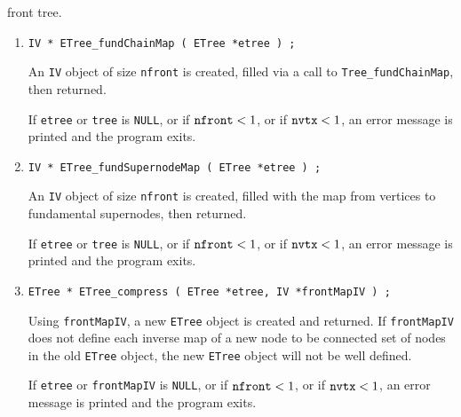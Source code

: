 front tree.
\begin{enumerate}
\item
\begin{verbatim}
IV * ETree_fundChainMap ( ETree *etree ) ;
\end{verbatim}
An {\tt IV} object of size {\tt nfront} is created, 
filled via a call to {\tt Tree\_fundChainMap},
then returned.
\par {}
If {\tt etree} or {\tt tree} is {\tt NULL},
or if ${\tt nfront} < 1$,
or if ${\tt nvtx} < 1$,
an error message is printed and the program exits.
\item
\begin{verbatim}
IV * ETree_fundSupernodeMap ( ETree *etree ) ;
\end{verbatim}
An {\tt IV} object of size {\tt nfront} is created, 
filled with the map from vertices to fundamental supernodes,
then returned.
\par {}
If {\tt etree} or {\tt tree} is {\tt NULL},
or if ${\tt nfront} < 1$,
or if ${\tt nvtx} < 1$,
an error message is printed and the program exits.
\item
\begin{verbatim}
ETree * ETree_compress ( ETree *etree, IV *frontMapIV ) ;
\end{verbatim}
Using {\tt frontMapIV}, a new {\tt ETree} object is created
and returned.
If {\tt frontMapIV} does not define each inverse map of a new node
to be connected set of nodes in the old {\tt ETree} object,
the new {\tt ETree} object will not be well defined.
\par {}
If {\tt etree} or {\tt frontMapIV} is {\tt NULL},
or if ${\tt nfront} < 1$,
or if ${\tt nvtx} < 1$,
an error message is printed and the program exits.
\end{enumerate}
\par
